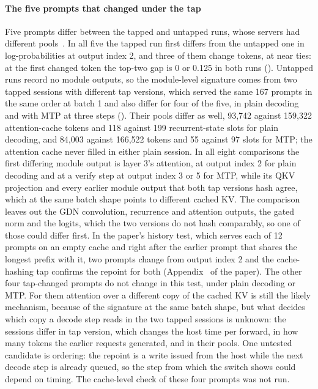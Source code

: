 \paragraph{The five prompts that changed under the tap} Five prompts differ between the tapped and untapped runs, whose servers had different pools~. In all five the tapped run first differs from the untapped one in log-probabilities at output index 2, and three of them change tokens, at near ties: at the first changed token the top-two gap is 0 or 0.125 in both runs (). Untapped runs record no module outputs, so the module-level signature comes from two tapped sessions with different tap versions, which served the same 167 prompts in the same order at batch 1 and also differ for four of the five, in plain decoding and with MTP at three steps (). Their pools differ as well, 93,742 against 159,322 attention-cache tokens and 118 against 199 recurrent-state slots for plain decoding, and 84,003 against 166,522 tokens and 55 against 97 slots for MTP; the attention cache never filled in either plain session. In all eight comparisons the first differing module output is layer 3's attention, at output index 2 for plain decoding and at a verify step at output index 3 or 5 for MTP, while its QKV projection and every earlier module output that both tap versions hash agree, which at the same batch shape points to different cached KV. The comparison leaves out the GDN convolution, recurrence and attention outputs, the gated norm and the logits, which the two versions do not hash comparably, so one of those could differ first. In the paper's history test, which serves each of 12 prompts on an empty cache and right after the earlier prompt that shares the longest prefix with it, two prompts change from output index 2 and the cache-hashing tap confirms the repoint for both (Appendix~ of the paper). The other four tap-changed prompts do not change in this test, under plain decoding or MTP. For them attention over a different copy of the cached KV is still the likely mechanism, because of the signature at the same batch shape, but what decides which copy a decode step reads in the two tapped sessions is unknown: the sessions differ in tap version, which changes the host time per forward, in how many tokens the earlier requests generated, and in their pools. One untested candidate is ordering: the repoint is a write issued from the host while the next decode step is already queued, so the step from which the switch shows could depend on timing. The cache-level check of these four prompts was not run.

